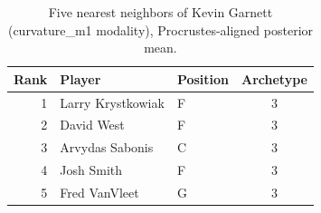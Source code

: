 \begin{table}[htbp]
  \centering\small
  \begin{tabular}{rllc}
    \toprule
    Rank & Player & Position & Archetype \\
    \midrule
    1 & Larry Krystkowiak & F & 3 \\
    2 & David West & F & 3 \\
    3 & Arvydas Sabonis & C & 3 \\
    4 & Josh Smith & F & 3 \\
    5 & Fred VanVleet & G & 3 \\
    \bottomrule
  \end{tabular}
  \caption{Five nearest neighbors of Kevin Garnett (curvature_m1 modality), Procrustes-aligned posterior mean.}
  \label{tab:Kevin_Garnett_neighbors_curvature_m1}
\end{table}

